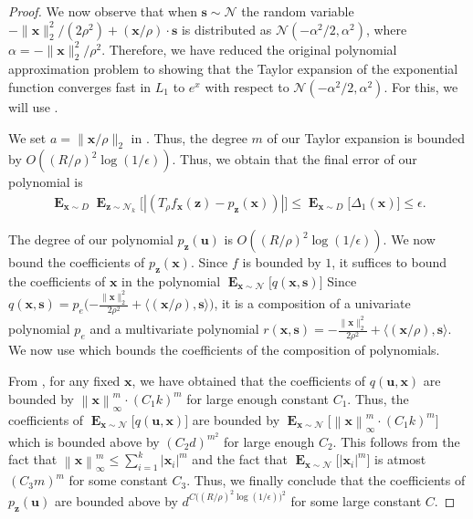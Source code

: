 \documentclass[10pt,a4paper]{article}
\newcommand\twonorm[1]{\|#1\|_2}
\newcommand\norm[1]{\left\| #1 \right\|}
\renewcommand\vec[1]{\mathbf{#1}}
\DeclareMathOperator*{\E}{\mathbf{E}}
\newcommand{\normal}{\mathcal{N}}
\newcommand{\1}{\Ind}
\newcommand{\x}{\vec x}
\newcommand{\vu}{\vec u}
\newcommand{\z}{\vec z}
\newcommand{\Gauss}{\mathcal{N}}
\begin{document}
\begin{proof}
    We now observe that when $\vec s \sim \normal$ the random variable 
    $-\|\x\|_2^2/(2 \rho^2) + (\x/\rho) \cdot \vec s$ is distributed as
    $\normal(-\alpha^2/2, \alpha^2)$, where $\alpha = -\|\x\|_2^2/\rho^2$.  
    Therefore, we have reduced the original polynomial approximation problem to showing that 
    the Taylor expansion of the exponential function converges fast in $L_1$ to $e^x$ with 
    respect to $\normal(-\alpha^2/2, \alpha^2)$. For this, we will use .
    
We set $a=\twonorm{\x/\rho}$ in . Thus, the degree $m$ of our Taylor expansion is bounded by $O((R/\rho)^2\log(1/\epsilon))$. Thus, we obtain that the final error of our polynomial is
        \begin{align*}
            \E_{\x\sim D}\E_{\z\sim \Gauss_k}\bigl[|(T_{\rho}f_{\x}(\z)-p_{\z}(\x))|\bigr]\leq \E_{\x\sim D}\bigl[\Delta_1(\x)\bigr]\leq \epsilon.
        \end{align*}
        
        The degree of our polynomial $p_{\z}(\vu)$ is $O((R/\rho)^2\log(1/\epsilon))$.  We now bound the coefficients of $p_{\z}(\x)$. Since $f$ is bounded by $1$, it suffices to bound the coefficients of $\x$ in the polynomial $\E_{\x\sim \Gauss}\bigl[q(\x,\vec s)\bigr]$ Since $q(\x,\vec s)=p_e\bigl({-\frac{\twonorm{\x}^2}{2\rho^2}+\langle (\x/\rho),\vec s\rangle}\bigr)$, it is a composition of a univariate polynomial $p_e$ and a multivariate polynomial $r(\x,\vec s)={-\frac{\twonorm{\x}^2}{2\rho^2}+\langle (\x/\rho),\vec s\rangle}$. We now use  which bounds the coefficients of the composition of polynomials. 
    
From , for any fixed $\x$, we have obtained that the coefficients of $q(\vu,\x)$ are bounded by $\norm{\x}_{\infty}^{m}\cdot (C_1k)^{m}$ for large enough constant $C_1$. Thus, the coefficients of $\E_{\x\sim \Gauss}\bigl[q(\vu,\x)\bigr]$ are bounded by $\E_{\x\sim \Gauss}\bigl[\norm{\x}_{\infty}^m\cdot (C_1k)^{m}\bigr]$ which is bounded above by $(C_2d)^{m^2}$ for large enough $C_2$. This follows from the fact that $\norm{\x}_{\infty}^m\leq \sum_{i=1}^{k}|\x_i|^m$ and the fact that $\E_{\x\sim \Gauss}\bigl[|\x_i|^m\bigr]$ is atmost $(C_3 m)^m$ for some constant $C_3$. Thus, we finally conclude that the coefficients of $p_{\z}(\vu)$ are bounded above by $d^{C\bigl((R/\rho)^2\log(1/\epsilon)\bigr)^2}$ for some large constant $C$.
\end{proof}
\end{document}
